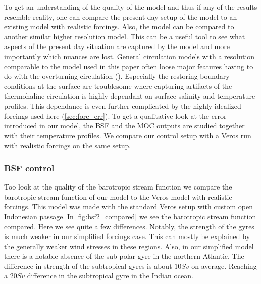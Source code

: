 To get an understanding of the quality of the model and thus if any of the results resemble reality, one can compare the present day setup of the model to an existing model with realistic forcings. Also, the model can be compared to another similar higher resolution model. This can be a useful tool to see what aspects of the present day situation are captured by the model and more importantly which nuances are lost. General circulation models with a resolution comparable to the model used in this paper often loose major features having to do with the overturning circulation (\cite{stone1990limitations}). Especially the restoring boundary conditions at the surface are troublesome where capturing artifacts of the thermohaline circulation is highly dependant on surface salinity and temperature profiles. This dependance is even further complicated by the highly idealized forcings used here (\cref{sec:forc_err}). To get a qualitative look at the error introduced in our model, the BSF and the MOC outputs are studied together with their temperature profiles. We compare our control setup with a Veros run with realistic forcings on the same setup.

\subsubsection{BSF control}
Too look at the quality of the barotropic stream function we compare the barotropic stream function of our model to the Veros model with realistic forcings. This model was made with the standard Veros setup with custom open Indonesian passage. In \cref{fig:bsf2_compared} we see the barotropic stream function compared. Here we see quite a few differences. Notably, the strength of the gyres is much weaker in our simplified forcings case. This can mostly be explained by the generally weaker wind stresses in these regions. Also, in our simplified model there is a notable absence of the sub polar gyre in the northern Atlantic. The difference in strength of the subtropical gyres is about $10Sv$ on average. Reaching a $20 Sv$ difference in the subtropical gyre in the Indian ocean. 




